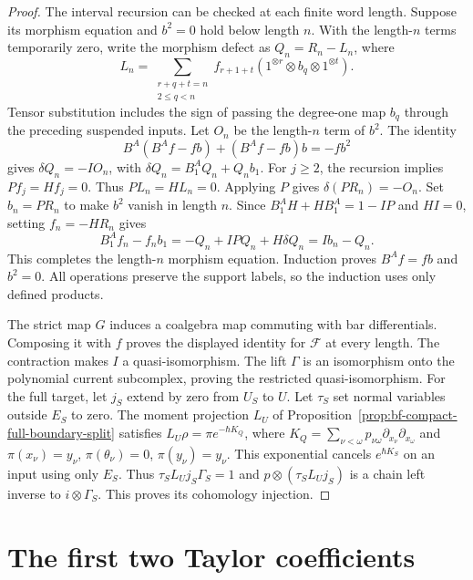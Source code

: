 \begin{proof}
The interval recursion can be checked at each finite word length.
Suppose its morphism equation and $b^2=0$ hold below length $n$.
With the length-$n$ terms temporarily zero, write the morphism defect
as $Q_n=R_n-L_n$, where
\[
 L_n=\sum_{\substack{r+q+t=n\\2\le q<n}}
 f_{r+1+t}(1^{\otimes r}\otimes b_q\otimes1^{\otimes t}).
\]
Tensor substitution includes the sign of passing the degree-one
map $b_q$ through the preceding suspended inputs.
Let $O_n$ be the length-$n$ term of $b^2$.
The identity
\[
 B^A(B^Af-fb)+(B^Af-fb)b=-fb^2
\]
gives $\delta Q_n=-IO_n$, with
$\delta Q_n=B^A_1Q_n+Q_n b_1$.
For $j\ge2$, the recursion implies $Pf_j=Hf_j=0$.
Thus $PL_n=HL_n=0$.
Applying $P$ gives $\delta(PR_n)=-O_n$.
Set $b_n=PR_n$ to make $b^2$ vanish in length $n$.
Since $B^A_1H+HB^A_1=1-IP$ and $HI=0$, setting $f_n=-HR_n$
gives
\[
 B^A_1f_n-f_n b_1=-Q_n+IPQ_n+H\delta Q_n=Ib_n-Q_n.
\]
This completes the length-$n$ morphism equation.
Induction proves $B^Af=fb$ and $b^2=0$.
All operations preserve the support labels, so the induction uses
only defined products.

The strict map $G$ induces a coalgebra map commuting with bar
differentials.  Composing it with $f$ proves the displayed identity
for $\mathcal F$ at every length.
The contraction makes $I$ a quasi-isomorphism.
The lift $\Gamma$ is an isomorphism onto the polynomial current
subcomplex, proving the restricted quasi-isomorphism.
For the full target, let $j_S$ extend by zero from $U_S$ to $U$.
Let $\tau_S$ set normal variables outside $E_S$ to zero.
The moment projection $L_U$ of
Proposition~\ref{prop:bf-compact-full-boundary-split} satisfies
$L_U\rho=\pi e^{-\hbar K_Q}$, where
$K_Q=\sum_{\nu<\omega}p_{\nu\omega}\partial_{x_\nu}\partial_{x_\omega}$
and $\pi(x_\nu)=y_\nu$, $\pi(\theta_\nu)=0$, $\pi(y_\nu)=y_\nu$.
This exponential cancels $e^{\hbar K_S}$ on an input using only $E_S$.
Thus $\tau_SL_Uj_S\Gamma_S=1$ and
$p\otimes(\tau_SL_Uj_S)$ is a chain left inverse to $i\otimes\Gamma_S$.
This proves its cohomology injection.
\end{proof}

\section{The first two Taylor coefficients}


